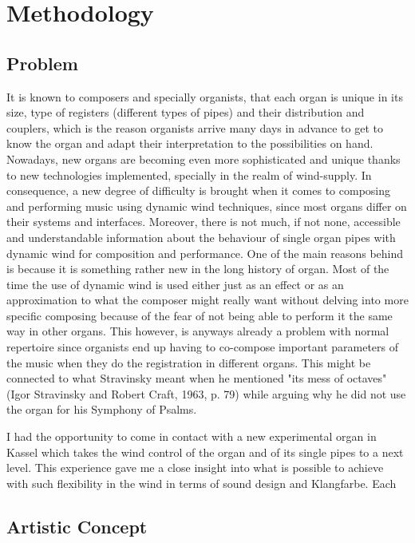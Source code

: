\chapter{Methodology}
\section{Problem}

It is known to composers and specially organists, that each organ is unique in its size, type of registers (different types of pipes) and their distribution and couplers, which is the reason organists arrive many days in advance to get to know the organ and adapt their interpretation to the possibilities on hand. Nowadays, new organs are becoming even more sophisticated and unique thanks to new technologies implemented, specially in the realm of wind-supply. In consequence, a new degree of difficulty is brought when it comes to composing and performing music using dynamic wind techniques, since most organs differ on their systems and interfaces. Moreover, there is not much, if not none, accessible and understandable information about the behaviour of single organ pipes with dynamic wind for composition and performance. One of the main reasons behind is because it is something rather new in the long history of organ. Most of the time the use of dynamic wind is used either just as an effect or as an approximation to what the composer might really want without delving into more specific composing because of the fear of not being able to perform it the same way in other organs. This however, is anyways already a problem with normal repertoire since organists end up having to co-compose important parameters of the music when they do the registration in different organs. This might be connected to what Stravinsky meant when he mentioned "its mess of octaves" (Igor Stravinsky and Robert Craft, 1963, p. 79) while arguing why he did not use the organ for his Symphony of Psalms. 

I had the opportunity to come in contact with a new experimental organ in Kassel which takes the wind control of the organ and of its single pipes to a next level. This experience gave me a close insight into what is possible to achieve with such flexibility in the wind in terms of sound design and Klangfarbe. Each


\section{Artistic Concept}

